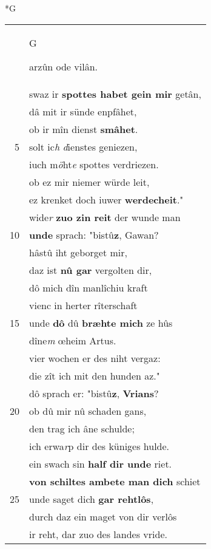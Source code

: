 \documentclass[8pt,a4paper,notitlepage]{article}
\begin{document}
\begin{table}[ht]
\begin{minipage}[t]{0.5\linewidth}
\small
\begin{center}*G
\end{center}
\begin{tabular}{rl}
 & \begin{large}G\end{large}arzûn ode vilân.\\ 
 & swaz ir \textbf{spottes habet gein mir} getân,\\ 
 & dâ mit ir sünde enpfâhet,\\ 
 & ob ir mîn dienst \textbf{smâhet}.\\ 
5 & solt ic\textit{h} \textit{d}ienstes geniezen,\\ 
 & iuch m\textit{ö}ht\textit{e} spottes verdriezen.\\ 
 & ob ez mir niemer würde leit,\\ 
 & ez krenket doch iuwer \textbf{werdecheit}."\\ 
 & wide\textit{r} \textbf{zuo zin reit} der wunde man\\ 
10 & \textbf{unde} sprach: "bistû\textbf{z}, Gawan?\\ 
 & hâstû iht geborget mir,\\ 
 & daz ist \textbf{nû gar} vergolten dir,\\ 
 & dô mich dîn manlîchiu kraft\\ 
 & vienc in herter rîterschaft\\ 
15 & unde \textbf{dô} dû \textbf{bræhte mich} ze hûs\\ 
 & dîne\textit{m} œheim Artus.\\ 
 & vier wochen er des niht vergaz:\\ 
 & die zît ich mit den hunden az."\\ 
 & dô sprach er: "bistû\textbf{z}, \textbf{Vrians}?\\ 
20 & ob dû mir nû schaden gans,\\ 
 & den trag ich âne schulde;\\ 
 & ich erwa\textit{r}p dir des küniges hulde.\\ 
 & ein swach sin \textbf{half dir unde} riet.\\ 
 & \textbf{von schiltes ambete man dich} schiet\\ 
25 & unde saget dich \textbf{gar rehtlôs},\\ 
 & durch daz ein maget von dir verlôs\\ 
 & ir reht, dar zuo des landes vride.\\ 

\end{tabular}
\end{minipage}
\end{table}
\end{document}
